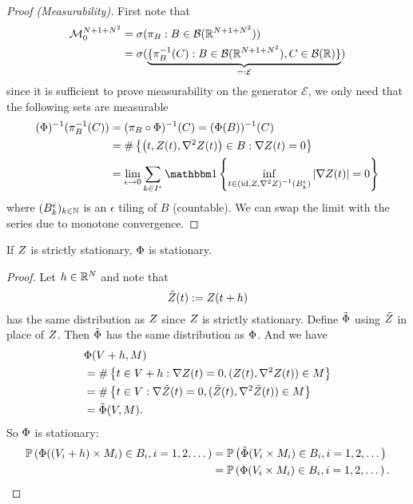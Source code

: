 \begin{proof}[Proof (Measurability)]
	First note that	
	\begin{align*}
		\locFiniteMeasAlg[\dims+1+\dims^2]
		&= \sigma(\pi_B : B\in\borel(\real^{\dims+1+\dims^2}))\\
		&=\sigma(\underbrace{
			\{\pi_B^{-1}(C) : B\in\borel(\real^{\dims+1+\dims^2}), C\in\borel(\real)\}
		}_{=:\mathcal{E}}
		)
	\end{align*}
	since it is sufficient to prove measurability on the generator
	\(\mathcal{E}\), we only need that the following sets are measurable
	\begin{align*}
		(\pp)^{-1}(\pi^{-1}_{B}(C))
		&= (\pi_{B} \circ \pp)^{-1}(C)
		= (\pp(B))^{-1}(C)\\
		&= \#\left\{\left(t,\rf(t),\nabla^2\rf(t)\right) \in B:
			\nabla\rf(t)=0
		\right\}\\
		&= \lim_{\epsilon\to 0} \sum_{k\in I^\epsilon}
		\ind\left\{
			\inf_{t\in \left(\text{id}, \rf, \nabla^2\rf\right)^{-1}(B^\epsilon_k) }
		|\nabla \rf(t)| = 0
		\right\}
	\end{align*}
	where \((B^\epsilon_k)_{k\in\nat}\) is an \(\epsilon\) tiling of \(B\) (countable).
	We can swap the limit with the series due to monotone convergence.
\end{proof}

\begin{lemma}[Stationarity]
	If \(\rf\) is strictly stationary, \(\pp\) is stationary.
\end{lemma}
\begin{proof}
	Let \(h\in \real^\dims\) and note that
	\[
		\tilde{\rf}(t) := \rf(t+h)
	\]
	has the same distribution as \(\rf\) since \(\rf\) is strictly stationary. Define
	\(\tilde{\pp}\) using \(\tilde{\rf}\) in place of \(\rf\). Then
	\(\tilde{\pp}\) has the same distribution as \(\pp\).
	And we have
	\begin{align*}
		&\pp(\Vol+h, M)\\
		&= \#\left\{t\in\Vol+h:
			\nabla\rf(t)=0,
			(\rf(t),\nabla^2\rf(t))\in M
		\right\}\\
		&= \#\left\{t\in\Vol:
			\nabla\tilde{\rf}(t)=0,
			(\tilde{\rf}(t),\nabla^2\tilde{\rf}(t))\in M
		\right\}\\
		&= \tilde{\pp}(\Vol, M).
	\end{align*}
	So \(\pp\) is stationary:
	\begin{align*}
		\Pr\left(\pp((\Vol_i+h)\times M_i)\in B_i, i=1,2,\dots\right)
		&= \Pr\left(\tilde{\pp}(\Vol_i\times M_i)\in B_i, i=1,2,\dots\right)\\
		&= \Pr\left(\pp(\Vol_i\times M_i)\in B_i, i=1,2,\dots\right).
		\qedhere
	\end{align*}
\end{proof}


